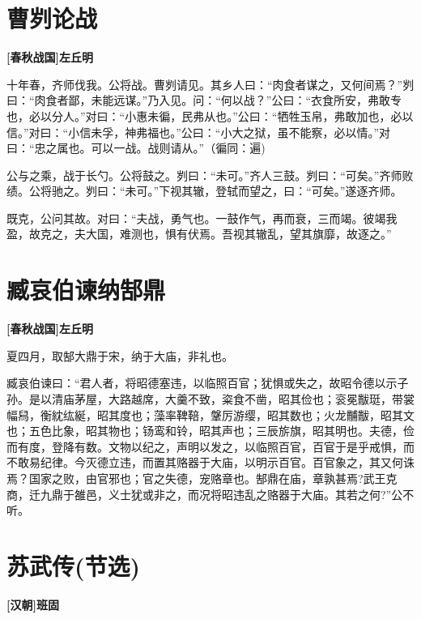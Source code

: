 \documentclass[UTF8,titlepage,oneside]{ctexbook}
\begin{document}
\chapter*{曹刿论战}
\begin{center}
	\textbf{[春秋战国]左丘明}
\end{center}


十年春，齐师伐我。公将战。曹刿请见。其乡人曰：“肉食者谋之，又何间焉？”刿曰：“肉食者鄙，未能远谋。”乃入见。问：“何以战？”公曰：“衣食所安，弗敢专也，必以分人。”对曰：“小惠未徧，民弗从也。”公曰：“牺牲玉帛，弗敢加也，必以信。”对曰：“小信未孚，神弗福也。”公曰：“小大之狱，虽不能察，必以情。”对曰：“忠之属也。可以一战。战则请从。”（徧同：遍)


公与之乘，战于长勺。公将鼓之。刿曰：“未可。”齐人三鼓。刿曰：“可矣。”齐师败绩。公将驰之。刿曰：“未可。”下视其辙，登轼而望之，曰：“可矣。”遂逐齐师。


既克，公问其故。对曰：“夫战，勇气也。一鼓作气，再而衰，三而竭。彼竭我盈，故克之，夫大国，难测也，惧有伏焉。吾视其辙乱，望其旗靡，故逐之。”



\chapter*{臧哀伯谏纳郜鼎}
\begin{center}
	\textbf{[春秋战国]左丘明}
\end{center}


夏四月，取郜大鼎于宋，纳于大庙，非礼也。


臧哀伯谏曰：“君人者，将昭德塞违，以临照百官；犹惧或失之，故昭令德以示子孙。是以清庙茅屋，大路越席，大羹不致，粢食不凿，昭其俭也；衮冕黻珽，带裳幅舄，衡紞纮綖，昭其度也；藻率鞞鞛，鞶厉游缨，昭其数也；火龙黼黻，昭其文也；五色比象，昭其物也；钖鸾和铃，昭其声也；三辰旂旗，昭其明也。夫德，俭而有度，登降有数。文物以纪之，声明以发之，以临照百官，百官于是乎戒惧，而不敢易纪律。今灭德立违，而置其赂器于大庙，以明示百官。百官象之，其又何诛焉？国家之败，由官邪也；官之失德，宠赂章也。郜鼎在庙，章孰甚焉?武王克商，迁九鼎于雒邑，义士犹或非之，而况将昭违乱之赂器于大庙。其若之何?”公不听。



\chapter*{苏武传(节选)}
\begin{center}
	\textbf{[汉朝]班固}
\end{center}
\end{document}
